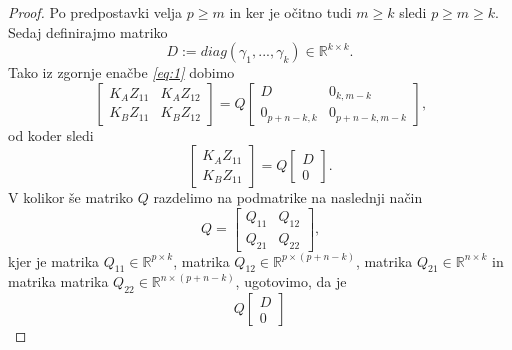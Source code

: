 \documentclass[mat1]{article}
\begin{document}
\begin{proof}
Po predpostavki velja $p \geq m$ in ker je očitno tudi $m \geq k$ sledi $p \geq m \geq k$. Sedaj definirajmo matriko 
$$ D := diag(\gamma_1,..., \gamma_k) \in \mathbb{R}^{k \times k} \text{.}
$$
Tako iz zgornje enačbe \textit{\eqref{eq:1}} dobimo
\begin{equation}
\begin{bmatrix}
K_A Z_{11} & K_A Z_{12} \\ 
K_B Z_{11} & K_B Z_{12}
\end{bmatrix} = Q
\begin{bmatrix}
D & 0_{k, m-k} \\ 
0_{p+n-k, k} & 0_{p+n-k, m-k} 
\end{bmatrix} \text{,} \label{eq:2}
\end{equation}
od koder sledi
$$
\begin{bmatrix}
K_A Z_{11} \\ 
K_B Z_{11}
\end{bmatrix} = Q
\begin{bmatrix}
D \\ 
0
\end{bmatrix} \text{.}
$$
V kolikor še matriko $Q$ razdelimo na podmatrike na naslednji način
$$ Q = 
\begin{bmatrix}
Q_{11} & Q_{12} \\ 
Q_{21} & Q_{22}
\end{bmatrix} \text{,}
$$ kjer je matrika $Q_{11} \in \mathbb{R}^{p \times k}$, matrika $Q_{12} \in \mathbb{R}^{p \times (p+n-k)}$, matrika $Q_{21} \in \mathbb{R}^{ n \times k}$ in matrika matrika $Q_{22} \in \mathbb{R}^{ n \times (p+n-k)}$, ugotovimo, da je
$$Q
\begin{bmatrix}
D \\ 
0

\end{bmatrix}$$
\end{proof}
\end{document}
